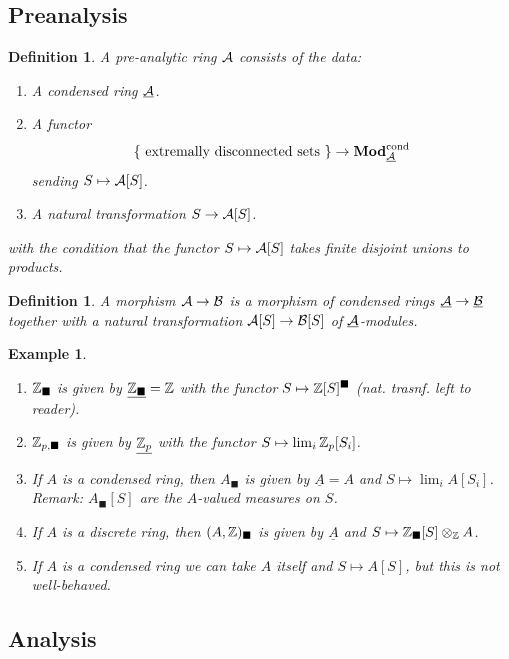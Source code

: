 \documentclass[A4paper, british]{amsart}
\theoremstyle{darkgreentheorem}
\theoremstyle{darkbluedefinition}
\newtheorem{defn}[thm]{Definition}
\theoremstyle{darkredexample}
\newtheorem{exa}[thm]{Example}
\theoremstyle{remark}
\newcommand{\1}{\mathbbm{1}}
\renewcommand{\u}[1]{\underline{#1}}
\newcommand{\ot}{\otimes}
\newcommand{\solid}{^{\blacksquare}}
\newcommand{\usolid}{_{\blacksquare}}
\begin{document}
\subsection{Preanalysis}

\begin{defn}
    A \textit{pre-analytic ring} $\mathcal{A}$ consists of the data:
    \begin{enumerate}[label=\roman*)]
	\item A condensed ring $\u{\calA}$.
	\item A functor
	    \[ \{ \text{ extremally disconnected sets }\}\to \Mod_{\u{\calA}}^{\text{cond}} \]
	    sending $S\mapsto \mathcal{A}[S]$.
	\item A natural transformation $S\to \mathcal{A}[S]$.
    \end{enumerate}
    with the condition that the functor $S\mapsto \mathcal{A}[S]$ takes finite disjoint unions to products.
\end{defn}

\begin{defn}
    A morphism $\mathcal{A}\to \mathcal{B}$ is a morphism of condensed rings $\u{\calA}\to \u{\calB}$ together with a natural transformation $\mathcal{A}[S]\to \mathcal{B}[S]$ of $\u{\calA}$-modules.
\end{defn}

\begin{exa}
    \begin{enumerate}[label=\roman*)]
	\item $\Z\usolid$ is given by $\u{\Z\usolid}=\Z$ with the functor $S\mapsto \Z[S]\solid$ (nat. trasnf. left to reader).
	\item $\mathbb{Z}_{p,\blacksquare}$ is given by $\u{\Z_{p}}$ with the functor $S\mapsto \lim_{i}\mathbb{Z}_{p}[S_{i}]$.
	\item If $A$ is a condensed ring, then $A\usolid$ is given by $\u{A}=A$ and $S\mapsto \lim_{i}A[S_{i}]$.
	    Remark: $A\usolid[S]$ are the $A$-valued measures on $S$.
	\item If $A$ is a discrete ring, then $(A,\Z)\usolid$ is given by $\u{A}$ and $S\mapsto \Z\usolid[S]\ot_{\Z}A$.
	\item If $A$ is a condensed ring we can take $A$ itself and $S\mapsto A[S]$, but this is not well-behaved.
    \end{enumerate}
\end{exa}

\subsection{Analysis}
\end{document}

